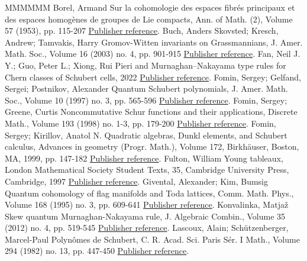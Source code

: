 \begin{thebibliography}{MMMMMM}
 Borel, Armand Sur la cohomologie des espaces fibrés principaux et des espaces homogènes de groupes de Lie compacts, Ann. of Math. (2), Volume 57 (1953), pp. 115-207 \href{https://alco.centre-mersenne.org/articles/10.5802/alco.427/#Borel}{Publisher reference}.
 Buch, Anders Skovsted; Kresch, Andrew; Tamvakis, Harry Gromov-Witten invariants on Grassmannians, J. Amer. Math. Soc., Volume 16 (2003) no. 4, pp. 901-915 \href{https://alco.centre-mersenne.org/articles/10.5802/alco.427/#BKT}{Publisher reference}.
 Fan, Neil J. Y.; Guo, Peter L.; Xiong, Rui Pieri and Murnaghan–Nakayama type rules for Chern classes of Schubert cells, 2022 \href{https://alco.centre-mersenne.org/articles/10.5802/alco.427/#FGX}{Publisher reference}.
 Fomin, Sergey; Gelfand, Sergei; Postnikov, Alexander Quantum Schubert polynomials, J. Amer. Math. Soc., Volume 10 (1997) no. 3, pp. 565-596 \href{https://alco.centre-mersenne.org/articles/10.5802/alco.427/#FGP}{Publisher reference}.
 Fomin, Sergey; Greene, Curtis Noncommutative Schur functions and their applications, Discrete Math., Volume 193 (1998) no. 1-3, pp. 179-200 \href{https://alco.centre-mersenne.org/articles/10.5802/alco.427/#FoGr98}{Publisher reference}.
 Fomin, Sergey; Kirillov, Anatol N. Quadratic algebras, Dunkl elements, and Schubert calculus, Advances in geometry (Progr. Math.), Volume 172, Birkhäuser, Boston, MA, 1999, pp. 147-182 \href{https://alco.centre-mersenne.org/articles/10.5802/alco.427/#FominKirillov}{Publisher reference}.
 Fulton, William Young tableaux, London Mathematical Society Student Texts, 35, Cambridge University Press, Cambridge, 1997 \href{https://alco.centre-mersenne.org/articles/10.5802/alco.427/#Fu97}{Publisher reference}.
 Givental, Alexander; Kim, Bumsig Quantum cohomology of flag manifolds and Toda lattices, Comm. Math. Phys., Volume 168 (1995) no. 3, pp. 609-641 \href{https://alco.centre-mersenne.org/articles/10.5802/alco.427/#GiventalKim}{Publisher reference}.
 Konvalinka, Matjaž Skew quantum Murnaghan-Nakayama rule, J. Algebraic Combin., Volume 35 (2012) no. 4, pp. 519-545 \href{https://alco.centre-mersenne.org/articles/10.5802/alco.427/#Ko12}{Publisher reference}.
 Lascoux, Alain; Schützenberger, Marcel-Paul Polynômes de Schubert, C. R. Acad. Sci. Paris Sér. I Math., Volume 294 (1982) no. 13, pp. 447-450 \href{https://alco.centre-mersenne.org/articles/10.5802/alco.427/#LaSch82}{Publisher reference}.

\end{thebibliography}
